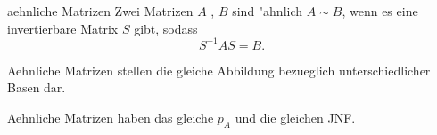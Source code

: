 \documentclass[class=article, crop=false]{standalone}
\begin{document}
\begin{zettel}{aehnliche Matrizen}
    Zwei Matrizen $A$ , $B$ sind "ahnlich $A \sim B$, wenn es eine invertierbare Matrix $S$ gibt, sodass
\[
    S^{-1} AS = B
.\]

Aehnliche Matrizen stellen die gleiche Abbildung bezueglich unterschiedlicher Basen dar.

Aehnliche Matrizen haben das gleiche $p_{A}$ und die gleichen JNF.

\end{zettel}
\end{document}
